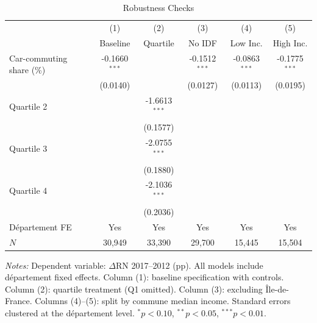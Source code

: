 \begin{table}[t]
\centering
\caption{Robustness Checks}
\label{tab:robust}
\begin{threeparttable}
\begin{tabular}{lccccc}
\hline\hline
 & (1) & (2) & (3) & (4) & (5) \\
 & Baseline & Quartile & No IDF & Low Inc. & High Inc. \\
\hline
Car-commuting share (\%) & -0.1660$^{***}$ & & -0.1512$^{***}$ & -0.0863$^{***}$ & -0.1775$^{***}$ \\
 & (0.0140) & & (0.0127) & (0.0113) & (0.0195) \\
Quartile 2 & & -1.6613$^{***}$ & & & \\
 & & (0.1577) & & & \\
Quartile 3 & & -2.0755$^{***}$ & & & \\
 & & (0.1880) & & & \\
Quartile 4 & & -2.1036$^{***}$ & & & \\
 & & (0.2036) & & & \\
\hline
D\'{e}partement FE & Yes & Yes & Yes & Yes & Yes \\
$N$ & 30,949 & 33,390 & 29,700 & 15,445 & 15,504 \\
\hline\hline
\end{tabular}
\begin{tablenotes}[flushleft]\small
\item \textit{Notes:} Dependent variable: $\Delta$RN 2017--2012 (pp). All models include d\'{e}partement fixed effects. Column (1): baseline specification with controls. Column (2): quartile treatment (Q1 omitted). Column (3): excluding \^{I}le-de-France. Columns (4)--(5): split by commune median income. Standard errors clustered at the d\'{e}partement level. $^{*}p<0.10$, $^{**}p<0.05$, $^{***}p<0.01$.
\end{tablenotes}
\end{threeparttable}
\end{table}

